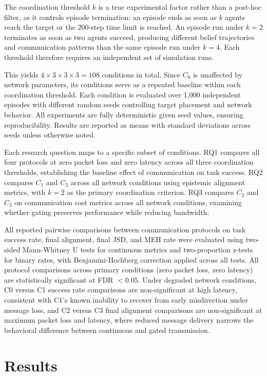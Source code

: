 \documentclass[pdflatex,sn-mathphys-num]{sn-jnl}%
\theoremstyle{thmstyleone}%
\theoremstyle{thmstyletwo}%
\theoremstyle{thmstylethree}%
\begin{document}
The coordination threshold $k$ is a true experimental factor rather
than a post-hoc filter, as it controls episode termination: an episode
ends as soon as $k$ agents reach the target or the 200-step time limit
is reached. An episode run under $k=2$ terminates as soon as two agents
succeed, producing different belief trajectories and communication
patterns than the same episode run under $k=4$. Each threshold
therefore requires an independent set of simulation runs.

This yields $4 \times 3 \times 3 \times 3 = 108$ conditions in total.
Since $C_0$ is unaffected by network parameters, its conditions serve
as a repeated baseline within each coordination threshold. Each
condition is evaluated over 1,000 independent episodes with
different random seeds controlling target placement
and network behavior. All experiments are fully deterministic given
seed values, ensuring reproducibility. Results are reported as means
with standard deviations across seeds unless otherwise noted.

Each research question maps to a specific subset of conditions. RQ1
compares all four protocols at zero packet loss and zero latency across
all three coordination thresholds, establishing the baseline effect of
communication on task success. RQ2 compares $C_1$ and $C_2$ across
all network conditions using epistemic alignment metrics, with $k=2$
as the primary coordination criterion. RQ3 compares $C_2$ and $C_3$
on communication cost metrics across all network conditions, examining
whether gating preserves performance while reducing bandwidth.

All reported pairwise comparisons between communication protocols on task success rate, final alignment, final JSD, and MEH rate were evaluated using two-sided Mann-Whitney U tests for continuous metrics and two-proportion z-tests for binary rates, with Benjamini-Hochberg correction applied across all tests. All protocol comparisons across primary conditions (zero packet loss, zero latency) are statistically significant at FDR $< 0.05$. Under degraded network conditions, C0 versus C1 success rate comparisons are non-significant at high latency, consistent with C1's known inability to recover from early misdirection under message loss, and C2 versus C3 final alignment comparisons are non-significant at maximum packet loss and latency, where reduced message delivery narrows the behavioral difference between continuous and gated transmission.
\section{Results}
\end{document}
